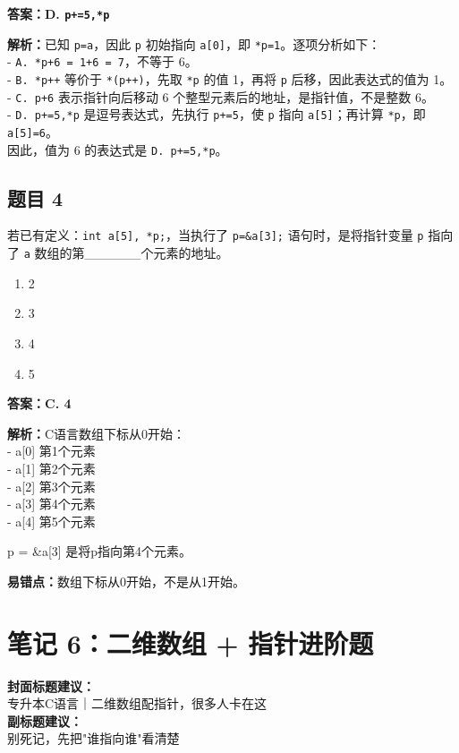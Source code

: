 \documentclass[12pt,a4paper]{ctexart}
\begin{document}
\begin{answerbox}
	\textbf{答案：D. \texttt{p+=5,*p}}

	\textbf{解析：}已知 \texttt{p=a}，因此 \texttt{p} 初始指向 \texttt{a[0]}，即 \texttt{*p=1}。逐项分析如下：\\
	- \texttt{A. *p+6 = 1+6 = 7}，不等于 6。\\
	- \texttt{B. *p++} 等价于 \texttt{*(p++)}，先取 \texttt{*p} 的值 1，再将 \texttt{p} 后移，因此表达式的值为 1。\\
	- \texttt{C. p+6} 表示指针向后移动 6 个整型元素后的地址，是指针值，不是整数 6。\\
	- \texttt{D. p+=5,*p} 是逗号表达式，先执行 \texttt{p+=5}，使 \texttt{p} 指向 \texttt{a[5]}；再计算 \texttt{*p}，即 \texttt{a[5]=6}。\\

	因此，值为 6 的表达式是 \texttt{D. p+=5,*p}。
\end{answerbox}

\subsection*{题目 4}
若已有定义：\texttt{int a[5], *p;}，当执行了 \texttt{p=\&a[3];} 语句时，是将指针变量 \texttt{p} 指向了 \texttt{a} 数组的第\_\_\_\_\_\_个元素的地址。
\begin{enumerate}[label=\Alph*.]
	\item 2
	\item 3
	\item 4
	\item 5
\end{enumerate}

\begin{answerbox}
	\textbf{答案：C. 4}

	\textbf{解析：}C语言数组下标从0开始：\\
	- a[0] 第1个元素\\
	- a[1] 第2个元素\\
	- a[2] 第3个元素\\
	- a[3] 第4个元素\\
	- a[4] 第5个元素

	p = \&a[3] 是将p指向第4个元素。

	\textbf{易错点：}数组下标从0开始，不是从1开始。
\end{answerbox}

\newpage

\section{笔记 6：二维数组 + 指针进阶题}
\begin{coverbox}
	\textbf{封面标题建议：}\\
	专升本C语言｜二维数组配指针，很多人卡在这\\
	\textbf{副标题建议：}\\
	别死记，先把"谁指向谁"看清楚
\end{coverbox}
\end{document}
